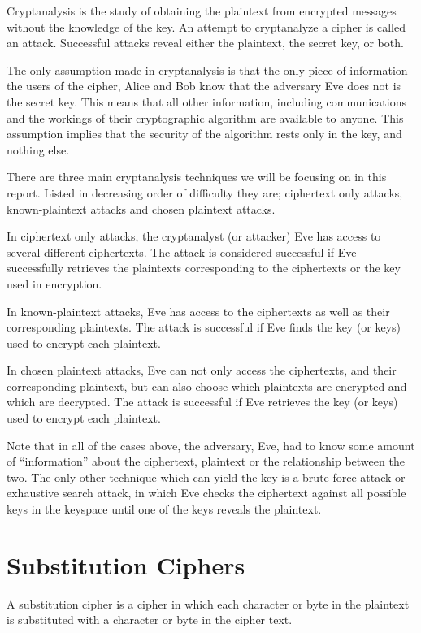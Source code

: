 \documentclass[12pt, a4paper, final]{report}
\begin{document}
Cryptanalysis is the study of obtaining the plaintext from encrypted
messages without the knowledge of the key. An attempt to cryptanalyze
a cipher is called an attack. Successful attacks reveal either the
plaintext, the secret key, or both.

The only assumption made in cryptanalysis is that the only piece of
information the users of the cipher, Alice and Bob know that the adversary
Eve does not is the secret key. This means that all other information,
including communications and the workings of their cryptographic algorithm
are available to anyone. This assumption implies that the security of
the algorithm rests only in the key, and nothing else.

There are three main cryptanalysis techniques we will be focusing on in
this report. Listed in decreasing order of difficulty they are; ciphertext
only attacks, known-plaintext attacks and chosen plaintext attacks.

In ciphertext only attacks, the cryptanalyst (or attacker) Eve has access
to several different ciphertexts. The attack is considered successful if
Eve successfully retrieves the plaintexts corresponding to the ciphertexts
or the key used in encryption.

In known-plaintext attacks, Eve has access to the ciphertexts as well
as their corresponding plaintexts. The attack is successful if Eve
finds the key (or keys) used to encrypt each plaintext.

In chosen plaintext attacks, Eve can not only access the ciphertexts,
and their corresponding plaintext, but can also choose which plaintexts
are encrypted and which are decrypted. The attack is successful if Eve
retrieves the key (or keys) used to encrypt each plaintext.

Note that in all of the cases above, the adversary, Eve, had to know
some amount of ``information'' about the ciphertext, plaintext or the
relationship between the two. The only other technique which can yield
the key is a brute force attack or exhaustive search attack, in which
Eve checks the ciphertext against all possible keys in the keyspace until
one of the keys reveals the plaintext.

\section{Substitution Ciphers}

A substitution cipher is a cipher in which each character or byte in the
plaintext is substituted with a character or byte in the cipher text.
\end{document}
